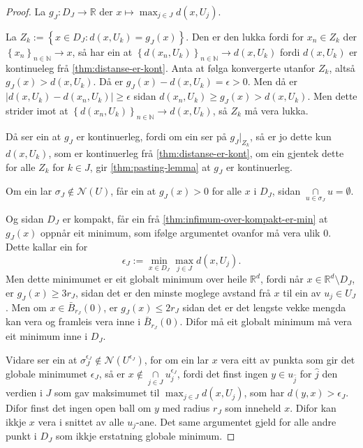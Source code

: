 \documentclass[a4paper, 12pt, norsk]{article}
\theoremstyle{plain}
\theoremstyle{definition}
\newcommand{\Rb}{\mathbb{R}}
\newcommand{\Nb}{\mathbb{N}}
\newcommand{\Nc}{\mathcal{N}}
\newcommand{\intersect}{ \mathop{\cap}\limits }
\newcommand{\set}[1]{ \left\{ #1 \right\} } %
\begin{document}
\begin{proof}
	La \( g_J: D_J \to \Rb \) der \( x \mapsto \max_{j \in J} d(x, U_j) \). 
	
	La \( Z_k := \set{x \in D_J: d(x, U_k) = g_J(x)} \). Den er den lukka fordi for \( x_n \in Z_k \) der \( \set{x_n}_{n\in\Nb} \to x \), så har ein at \( \set{d(x_n, U_k)}_{n\in\Nb} \to d(x, U_k) \) fordi \( d(x, U_k) \) er kontinueleg frå \autoref{thm:distanse-er-kont}. Anta at følga konvergerte utanfor \( Z_k \), altså \( g_J(x) > d(x, U_k) \). Då er \( g_J(x)-d(x, U_k) = \epsilon > 0 \). Men då er \( |d(x, U_k)-d(x_n, U_k)| \geq \epsilon \) sidan \( d(x_n, U_k) \geq g_J(x) > d(x, U_k) \). Men dette strider imot at \( \set{d(x_n, U_k)}_{n\in\Nb} \to d(x, U_k) \), så \( Z_k \) må vera lukka.
	
	Då ser ein at \( g_J \) er kontinuerleg, fordi om ein ser på \( g_J|_{Z_k} \), så er jo dette kun \( d(x, U_k) \), som er kontinuerleg frå \autoref{thm:distanse-er-kont}, om ein gjentek dette for alle \( Z_k \) for \( k \in J \), gir \autoref{thm:pasting-lemma} at \( g_J \) er kontinuerleg.

	Om ein lar \( \sigma_J \not\in \Nc(U) \), får ein at \( g_J(x) > 0 \) for alle \( x \) i \( D_J \), sidan \( \intersect_{u \in \sigma_J} u = \emptyset \).

	Og sidan \( D_J \) er kompakt, får ein frå \autoref{thm:infimum-over-kompakt-er-min} at \( g_J(x) \) oppnår eit minimum, som ifølge argumentet ovanfor må vera ulik \( 0 \). Dette kallar ein for
	\[
		\epsilon_J := \min_{x \in D_J} \max_{j \in J} d(x, U_j).
	\]
	Men dette minimumet er eit globalt minimum over heile \( \Rb^d \), fordi når \( x \in \Rb^d \setminus D_J \), er \( g_J(x) \geq 3r_J \), sidan det er den minste moglege avstand frå \( x \) til ein av \( u_j \in U_J \). Men om \( x \in \bar{B}_{r_J}(0) \), er \( g_J(x) \leq 2r_J \) sidan det er det lengste vekke mengda kan vera og framleis vera inne i \( \bar{B}_{r_J}(0) \). Difor må eit globalt minimum må vera eit minimum inne i \( D_J \).

	Vidare ser ein at \( \sigma_J^{\epsilon_J} \not\in \Nc(U^{\epsilon_J}) \), for om ein lar \( x \) vera eitt av punkta som gir det globale minimumet \( \epsilon_J \), så er \( x \not\in \intersect_{j \in J} u_j^{\epsilon_J} \), fordi det finst ingen \( y \in  u_{\hat{j}} \) for \( \hat{j} \) den verdien i \( J \) som gav maksimumet til \( \max_{j \in J} d(x, U_j) \), som har \( d(y, x) > \epsilon_J \). Difor finst det ingen open ball om \( y \) med radius \( r_J \) som inneheld \( x \). Difor kan ikkje \( x \) vera i snittet av alle \( u_j \)-ane. Det same argumentet gjeld for alle andre punkt i \( D_J \) som ikkje erstatning globale minimum.
	

\end{proof}
\end{document}
